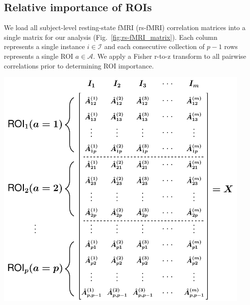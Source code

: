 \documentclass[10pt,letterpaper]{article}\usepackage[]{graphicx}\usepackage[]{color}
\begin{document}
\vspace{0.25cm}

\subsection{Relative importance of ROIs}

We load all subject-level resting-state fMRI (rs-fMRI) correlation matrices into a single matrix for our analysis (Fig.~\ref{fig:rs-fMRI_matrix}). Each column represents a single instance $i \in \mathcal{I}$ and each consecutive collection of $p-1$ rows represents a single ROI $a \in \mathcal{A}$. We apply a Fisher r-to-z transform to all pairwise correlations prior to determining ROI importance.

\bigskip

\begin{minipage}[c]{0.7\textwidth}\hspace{-0.6cm}
	\includegraphics[width=0.95\textwidth]{fig5_rs_fmri_all_instance_matrix.pdf}
\end{minipage}\hspace{-0.8cm}
\begin{minipage}[c]{0.3\textwidth}
	\captionsetup{type=figure}\label{fig:rs-fMRI_matrix}
\end{minipage}
\end{document}
